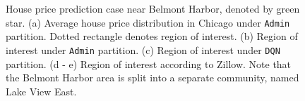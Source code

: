 \begin{figure}[t!]
\centering
{}
\caption{House price prediction case near Belmont Harbor, denoted by green star. (a) Average house price distribution in Chicago under \texttt{Admin} partition. Dotted rectangle denotes region of interest. (b) Region of interest under \texttt{Admin} partition. (c) Region of interest under \texttt{DQN} partition. (d - e) Region of interest according to Zillow. Note that the Belmont Harbor area is split into a separate community, named Lake View East.}
\label{fig:housePrice}
\end{figure}



